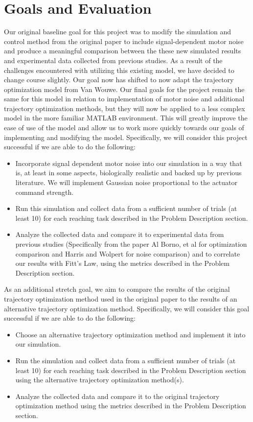\documentclass[table,12pt]{article}
\begin{document}
\section{Goals and Evaluation}
Our original baseline goal for this project was to modify the simulation and control method from the original paper to include signal-dependent motor noise and produce a meaningful comparison between the these new simulated results and experimental data collected from previous studies. As a result of the challenges encountered with utilizing this existing model, we have decided to change course slightly. Our goal now has shifted to now adapt the trajectory optimization model from Van Wouwe. Our final goals for the project remain the same for this model in relation to implementation of motor noise and additional trajectory optimization methods, but they will now be applied to a less complex model in the more familiar MATLAB environment. This will greatly improve the ease of use of the model and allow us to work more quickly towards our goals of implementing and modifying the model. Specifically, we will consider this project successful if we are able to do the following:
\begin{itemize}
    \item Incorporate signal dependent motor noise into our simulation in a way that is, at least in some aspects, biologically realistic and backed up by previous literature. We will implement Gaussian noise proportional to the actuator command strength.
    \item Run this simulation and collect data from a sufficient number of trials (at least 10) for each reaching task described in the Problem Description section. 
    \item Analyze the collected data and compare it to experimental data from previous studies (Specifically from the paper Al Borno, et al for optimization comparison and Harris and Wolpert for noise comparison) and to correlate our results with Fitt's Law, using the metrics described in the Problem Description section. 
\end{itemize}

As an additional stretch goal, we aim to compare the results of the original trajectory optimization method used in the original paper to the results of an alternative trajectory optimization method. Specifically, we will consider this goal successful if we are able to do the following:
\begin{itemize}
    \item Choose an alternative trajectory optimization method and implement it into our simulation.
    \item Run the simulation and collect data from a sufficient number of trials (at least 10) for each reaching task described in the Problem Description section using the alternative trajectory optimization method(s).
    \item Analyze the collected data and compare it to the original trajectory optimization method using the metrics described in the Problem Description section.
\end{itemize}
\end{document}
